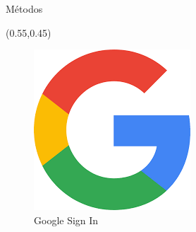 \documentclass[xcolor=pdftex,dvipsnames,table]{beamer}
\begin{document}
\begin{frame}{Métodos}
{    
    \begin{textblock*}{0.45\textwidth}(0.55\textwidth,0.45\textwidth)
        \begin{figure}
            \centering
            \includegraphics[width=0.4\linewidth]{auth/googlelogo.png}
            \caption*{Google Sign In}
            \label{fig:my_label}
        \end{figure}
    \end{textblock*}
}
\end{frame}
\end{document}
